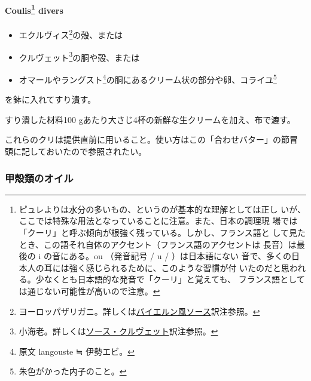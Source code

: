 \begin{recette}
\hypertarget{coulis-divers}{%
\paragraph[Coulis divers]{\texorpdfstring{Coulis\footnote{ピュレよりは水分の多いもの、というのが基本的な理解としては正し
  いが、ここでは特殊な用法となっていることに注意。また、日本の調理現
  場では「クーリ」と呼ぶ傾向が根強く残っている。しかし、フランス語と
  して見たとき、この語それ自体のアクセント（フランス語のアクセントは
  長音）は最後の i の音にある。ou （発音記号 / u / ）は日本語にない
  音で、多くの日本人の耳には強く感じられるために、このような習慣が付
  いたのだと思われる。少なくとも日本語的な発音で「クーリ」と覚えても、
  フランス語としては通じない可能性が高いので注意。}
divers}{Coulis divers}}\label{coulis-divers}}


\begin{itemize}
\item
  エクルヴィス\footnote{ヨーロッパザリガニ。詳しくは\protect\hyperlink{sauce-bavaroise}{バイエルン風ソース}訳注参照。}の殻、または
\item
  クルヴェット\footnote{小海老。詳しくは\protect\hyperlink{sauce-aux-crevettes}{ソース・クルヴェット}訳注参照。}の胴や殻、または
\item
  オマールやラングスト\footnote{原文 langouste ≒ 伊勢エビ。}の胴にあるクリーム状の部分や卵、コライユ\footnote{朱色がかった内子のこと。}
\end{itemize}

を鉢に入れてすり潰す。

すり潰した材料100 gあたり大さじ4杯の新鮮な生クリームを加え、布で漉す。

これらのクリは提供直前に用いること。使い方はこの「合わせバター」の節冒
頭に記しておいたので参照されたい。

\maeaki

\hypertarget{ux7532ux6bbbux985eux306eux30aaux30a4ux30eb}{%
\subsubsection{甲殻類のオイル}\label{ux7532ux6bbbux985eux306eux30aaux30a4ux30eb}}

\hypertarget{huile-de-crustaces}{%
}
\end{recette}
